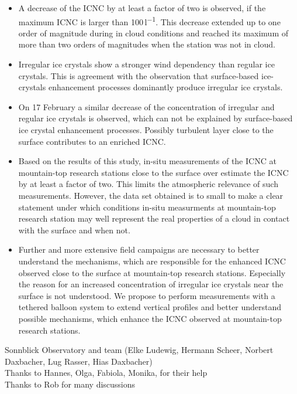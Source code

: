 \documentclass[draft,linenumbers]{agujournal}
\begin{document}
\begin{itemize}
\item A decrease of the ICNC by at least a factor of two is observed, if the maximum ICNC is larger than 100\,\si{l^{-1}}. This decrease extended up to one order of magnitude during in cloud conditions and reached its maximum of more than two orders of magnitudes when the station was not in cloud.
\item Irregular ice crystals show a stronger wind dependency than regular ice crystals. This is agreement with the observation that surface-based ice-crystals enhancement processes dominantly produce irregular ice crystals.
\item On 17 February a similar decrease of the concentration of irregular and regular ice crystals is observed, which can not be explained by surface-based ice crystal enhancement processes. Possibly turbulent layer close to the surface contributes to an enriched ICNC.
\item Based on the results of this study, in-situ measurements of the ICNC at mountain-top research stations close to the surface over estimate the ICNC by at least a factor of two. This limits the atmospheric relevance of such measurements. However, the data set obtained is to small to make a clear statement under which conditions in-situ measurments at mountain-top research station may well represent the real properties of a cloud in contact with the surface and when not.
\item Further and more extensive field campaigns are necessary to better understand the mechanisms, which are responsible for the enhanced ICNC observed close to the surface at mountain-top research stations. Especially the reason for an increased concentration of irregular ice crystals near the surface is not understood. We propose to perform measurements with a tethered balloon system to extend vertical profiles and better understand possible mechanisms, which enhance the ICNC observed at mountain-top research stations.
\end{itemize}

\label{Summary}



\begin{acronyms}
\end{acronyms}


\acknowledgments
Sonnblick Observatory and team (Elke Ludewig, Hermann Scheer, Norbert Daxbacher, Lug Rasser, Hias Daxbacher)\\
Thanks to Hannes, Olga, Fabiola, Monika, for their help\\
Thanks to Rob for many discussions
\end{document}
